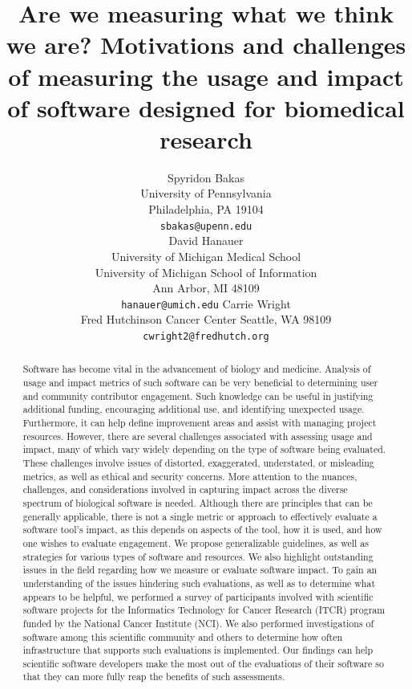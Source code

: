 \documentclass{article}
\title{Are we measuring what we think we are? Motivations and challenges of measuring the usage and impact of software designed for biomedical research}
\author{
Spyridon Bakas \\
    University of Pennsylvania \\
    Philadelphia, PA 19104 \\
    \texttt{sbakas@upenn.edu} \\
\AND
David Hanauer \\
    University of Michigan Medical School\\
    University of Michigan School of Information\\
    Ann Arbor, MI 48109\\
    \texttt{hanauer@umich.edu}
\AND
Carrie Wright \\
    Fred Hutchinson Cancer Center
    Seattle, WA 98109 \\
    \texttt{cwright2@fredhutch.org}\\
}
\begin{document}
\maketitle
\begin{abstract}
Software has become vital in the advancement of biology and medicine. Analysis of usage and impact metrics of such software can be very beneficial to determining user and community contributor engagement. Such knowledge can be useful in justifying additional funding, encouraging additional use, and identifying unexpected usage. Furthermore, it can help define improvement areas and assist with managing project resources. However, there are several challenges associated with assessing usage and impact, many of which vary widely depending on the type of software being evaluated. These challenges involve issues of distorted, exaggerated, understated, or misleading metrics, as well as ethical and security concerns.  More attention to the nuances, challenges, and considerations involved in capturing impact across the diverse spectrum of biological software is needed. Although there are principles that can be generally applicable, there is not a single metric or approach to effectively evaluate a software tool’s impact, as this depends on aspects of the tool, how it is used, and how one wishes to evaluate engagement. We propose generalizable guidelines, as well as strategies for various types of software and resources. We also highlight outstanding issues in the field regarding how we measure or evaluate software impact. To gain an understanding of the issues hindering such evaluations, as well as to determine what appears to be helpful, we performed a survey of participants involved with scientific software projects for the Informatics Technology for Cancer Research (ITCR) program funded by the National Cancer Institute (NCI). We also performed investigations of software among this scientific community and others to determine how often infrastructure that supports such evaluations is implemented.  Our findings can help scientific software developers make the most out of the evaluations of their software so that they can more fully reap the benefits of such assessments.
\end{abstract}


\end{document}
